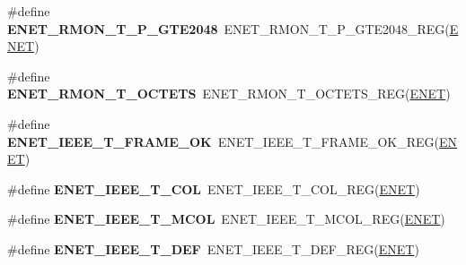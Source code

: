 \begin{DoxyCompactItemize}
\item 
\#define {\bfseries E\+N\+E\+T\+\_\+\+R\+M\+O\+N\+\_\+\+T\+\_\+\+P\+\_\+\+G\+T\+E2048}~E\+N\+E\+T\+\_\+\+R\+M\+O\+N\+\_\+\+T\+\_\+\+P\+\_\+\+G\+T\+E2048\+\_\+\+R\+EG(\hyperlink{group__ENET__Peripheral__Access__Layer_ga4745105f505f3ab949d6a57fbe2a0ed5}{E\+N\+ET})\hypertarget{group__ENET__Register__Accessor__Macros_ga6437d0d25e4b3d0f218a27a6f1558eb1}{}\label{group__ENET__Register__Accessor__Macros_ga6437d0d25e4b3d0f218a27a6f1558eb1}

\item 
\#define {\bfseries E\+N\+E\+T\+\_\+\+R\+M\+O\+N\+\_\+\+T\+\_\+\+O\+C\+T\+E\+TS}~E\+N\+E\+T\+\_\+\+R\+M\+O\+N\+\_\+\+T\+\_\+\+O\+C\+T\+E\+T\+S\+\_\+\+R\+EG(\hyperlink{group__ENET__Peripheral__Access__Layer_ga4745105f505f3ab949d6a57fbe2a0ed5}{E\+N\+ET})\hypertarget{group__ENET__Register__Accessor__Macros_gaafd6ce228ef03e734d1f2fa83d19d37c}{}\label{group__ENET__Register__Accessor__Macros_gaafd6ce228ef03e734d1f2fa83d19d37c}

\item 
\#define {\bfseries E\+N\+E\+T\+\_\+\+I\+E\+E\+E\+\_\+\+T\+\_\+\+F\+R\+A\+M\+E\+\_\+\+OK}~E\+N\+E\+T\+\_\+\+I\+E\+E\+E\+\_\+\+T\+\_\+\+F\+R\+A\+M\+E\+\_\+\+O\+K\+\_\+\+R\+EG(\hyperlink{group__ENET__Peripheral__Access__Layer_ga4745105f505f3ab949d6a57fbe2a0ed5}{E\+N\+ET})\hypertarget{group__ENET__Register__Accessor__Macros_ga321b9547e8c7a8dd69206b0d86ba917b}{}\label{group__ENET__Register__Accessor__Macros_ga321b9547e8c7a8dd69206b0d86ba917b}

\item 
\#define {\bfseries E\+N\+E\+T\+\_\+\+I\+E\+E\+E\+\_\+\+T\+\_\+C\+OL}~E\+N\+E\+T\+\_\+\+I\+E\+E\+E\+\_\+\+T\+\_\+C\+O\+L\+\_\+\+R\+EG(\hyperlink{group__ENET__Peripheral__Access__Layer_ga4745105f505f3ab949d6a57fbe2a0ed5}{E\+N\+ET})\hypertarget{group__ENET__Register__Accessor__Macros_gae66d0c804b174cf33bec1d515ea032e8}{}\label{group__ENET__Register__Accessor__Macros_gae66d0c804b174cf33bec1d515ea032e8}

\item 
\#define {\bfseries E\+N\+E\+T\+\_\+\+I\+E\+E\+E\+\_\+\+T\+\_\+\+M\+C\+OL}~E\+N\+E\+T\+\_\+\+I\+E\+E\+E\+\_\+\+T\+\_\+\+M\+C\+O\+L\+\_\+\+R\+EG(\hyperlink{group__ENET__Peripheral__Access__Layer_ga4745105f505f3ab949d6a57fbe2a0ed5}{E\+N\+ET})\hypertarget{group__ENET__Register__Accessor__Macros_gad96c85c312dbc71abf1716be0e465139}{}\label{group__ENET__Register__Accessor__Macros_gad96c85c312dbc71abf1716be0e465139}

\item 
\#define {\bfseries E\+N\+E\+T\+\_\+\+I\+E\+E\+E\+\_\+\+T\+\_\+\+D\+EF}~E\+N\+E\+T\+\_\+\+I\+E\+E\+E\+\_\+\+T\+\_\+\+D\+E\+F\+\_\+\+R\+EG(\hyperlink{group__ENET__Peripheral__Access__Layer_ga4745105f505f3ab949d6a57fbe2a0ed5}{E\+N\+ET})\hypertarget{group__ENET__Register__Accessor__Macros_ga669d751037e044b7415910a465762fd5}{}\label{group__ENET__Register__Accessor__Macros_ga669d751037e044b7415910a465762fd5}


\end{DoxyCompactItemize}
